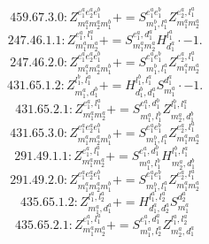 \documentclass[letterpaper,10pt,fleqn,leqno,onecolumn]{article}
\begin{document}
\begin{equation} \;\;\;\;\;\;  459.67.3.0: Z^{e_{1}^{a}e_{2}^{a}e_{1}^{b}}_{m_{1}^{a}m_{2}^{a}m_{1}^{b}}+=S^{e_{1}^{a}e_{1}^{b}}_{m_{1}^{b},l_{1}^{a}}Z^{e_{2}^{a},l_{1}^{a}}_{m_{1}^{a}m_{2}^{a}} \end{equation}
\begin{equation} \;\;\;\;\;\;  247.46.1.1: Z^{e_{1}^{a},l_{1}^{a}}_{m_{1}^{a}m_{2}^{a}}+=S^{e_{1}^{a},d_{1}^{a}}_{m_{1}^{a}m_{2}^{a}}H^{l_{1}^{a}}_{d_{1}^{a}}\cdot -1. \end{equation}
\begin{equation} \;\;\;\;\;\;  247.46.2.0: Z^{e_{1}^{a}e_{2}^{a}e_{1}^{b}}_{m_{1}^{a}m_{2}^{a}m_{1}^{b}}+=S^{e_{1}^{a}e_{1}^{b}}_{m_{1}^{b},l_{1}^{a}}Z^{e_{2}^{a},l_{1}^{a}}_{m_{1}^{a}m_{2}^{a}} \end{equation}
\begin{equation} \;\;\;\;\;\;  431.65.1.2: Z^{l_{1}^{b},l_{1}^{a}}_{m_{1}^{a},d_{1}^{b}}+=H^{l_{1}^{b},l_{1}^{a}}_{d_{1}^{b},d_{1}^{a}}S^{d_{1}^{a}}_{m_{1}^{a}}\cdot -1. \end{equation}
\begin{equation} \;\;\;\;\;\;  431.65.2.1: Z^{e_{1}^{a},l_{1}^{a}}_{m_{1}^{a}m_{2}^{a}}+=S^{e_{1}^{a},d_{1}^{b}}_{m_{1}^{a},l_{1}^{b}}Z^{l_{1}^{b},l_{1}^{a}}_{m_{2}^{a},d_{1}^{b}} \end{equation}
\begin{equation} \;\;\;\;\;\;  431.65.3.0: Z^{e_{1}^{a}e_{2}^{a}e_{1}^{b}}_{m_{1}^{a}m_{2}^{a}m_{1}^{b}}+=S^{e_{1}^{a}e_{1}^{b}}_{m_{1}^{b},l_{1}^{a}}Z^{e_{2}^{a},l_{1}^{a}}_{m_{1}^{a}m_{2}^{a}} \end{equation}
\begin{equation} \;\;\;\;\;\;  291.49.1.1: Z^{e_{1}^{a},l_{1}^{a}}_{m_{1}^{a}m_{2}^{a}}+=S^{e_{1}^{a},d_{1}^{b}}_{m_{1}^{a},l_{1}^{b}}H^{l_{1}^{b},l_{1}^{a}}_{m_{2}^{a},d_{1}^{b}} \end{equation}
\begin{equation} \;\;\;\;\;\;  291.49.2.0: Z^{e_{1}^{a}e_{2}^{a}e_{1}^{b}}_{m_{1}^{a}m_{2}^{a}m_{1}^{b}}+=S^{e_{1}^{a}e_{1}^{b}}_{m_{1}^{b},l_{1}^{a}}Z^{e_{2}^{a},l_{1}^{a}}_{m_{1}^{a}m_{2}^{a}} \end{equation}
\begin{equation} \;\;\;\;\;\;  435.65.1.2: Z^{l_{1}^{a},l_{2}^{a}}_{m_{1}^{a},d_{1}^{a}}+=H^{l_{1}^{a},l_{2}^{a}}_{d_{1}^{a},d_{2}^{a}}S^{d_{2}^{a}}_{m_{1}^{a}} \end{equation}
\begin{equation} \;\;\;\;\;\;  435.65.2.1: Z^{e_{1}^{a},l_{1}^{a}}_{m_{1}^{a}m_{2}^{a}}+=S^{e_{1}^{a},d_{1}^{a}}_{m_{1}^{a},l_{2}^{a}}Z^{l_{1}^{a},l_{2}^{a}}_{m_{2}^{a},d_{1}^{a}} \end{equation}
\end{document}
